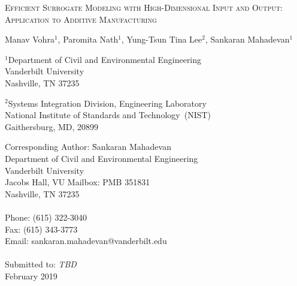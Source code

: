 \begin{center}
\textsc{Efficient Surrogate Modeling with High-Dimensional Input and Output:
Application to Additive Manufacturing}

\bigskip 
\bigskip 

Manav Vohra$^1$, Paromita Nath$^1$, Yung-Tsun Tina Lee$^2$,
Sankaran Mahadevan$^1$

\bigskip
\bigskip

\normalsize
$^1$Department of Civil and Environmental Engineering\\
Vanderbilt University\\
Nashville, TN 37235\\

\bigskip

$^2$Systems Integration Division, Engineering Laboratory\\
National Institute of Standards and Technology~(NIST)\\
Gaithersburg, MD, 20899

\end{center}

\vspace{6cm}

\begin{tabbing}
Corresponding Author: \hspace{5mm} \= Sankaran Mahadevan\\
       \>  Department of Civil and Environmental Engineering\\
       \>  Vanderbilt University\\
        Jacobs Hall, VU Mailbox: PMB 351831 \\
       \>  Nashville, TN 37235 \\
       \> \\
Phone: \> (615) 322-3040 \\
Fax:   \> (615) 343-3773 \\
Email: \>  sankaran.mahadevan@vanderbilt.edu   \\
\\
Submitted to: \> \textit{TBD} \\
\>  February 2019\\

\bigskip
\end{tabbing}

\clearpage

